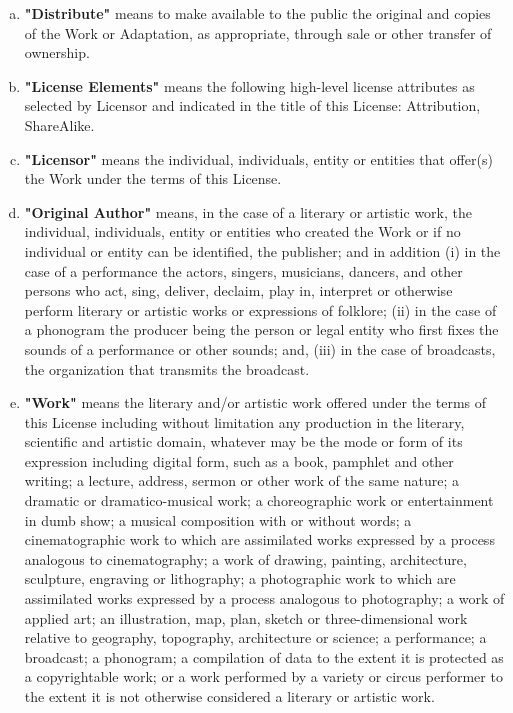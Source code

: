 \begin{enumerate}[a.]
          \item\textbf{"Distribute"} means to make available
          to the public the original and copies of the Work or
          Adaptation, as appropriate, through sale or other
          transfer of ownership.

          \item\textbf{"License Elements"} means the
          following high-level license attributes as selected by
          Licensor and indicated in the title of this License:
          Attribution, ShareAlike.

          \item\textbf{"Licensor"} means the individual,
          individuals, entity or entities that offer(s) the Work
          under the terms of this License.

          \item\textbf{"Original Author"} means, in the case
          of a literary or artistic work, the individual,
          individuals, entity or entities who created the Work or
          if no individual or entity can be identified, the
          publisher; and in addition (i) in the case of a
          performance the actors, singers, musicians, dancers, and
          other persons who act, sing, deliver, declaim, play in,
          interpret or otherwise perform literary or artistic works
          or expressions of folklore; (ii) in the case of a
          phonogram the producer being the person or legal entity
          who first fixes the sounds of a performance or other
          sounds; and, (iii) in the case of broadcasts, the
          organization that transmits the broadcast.

          \item\textbf{"Work"} means the literary and/or
          artistic work offered under the terms of this License
          including without limitation any production in the
          literary, scientific and artistic domain, whatever may be
          the mode or form of its expression including digital
          form, such as a book, pamphlet and other writing; a
          lecture, address, sermon or other work of the same
          nature; a dramatic or dramatico-musical work; a
          choreographic work or entertainment in dumb show; a
          musical composition with or without words; a
          cinematographic work to which are assimilated works
          expressed by a process analogous to cinematography; a
          work of drawing, painting, architecture, sculpture,
          engraving or lithography; a photographic work to which
          are assimilated works expressed by a process analogous to
          photography; a work of applied art; an illustration, map,
          plan, sketch or three-dimensional work relative to
          geography, topography, architecture or science; a
          performance; a broadcast; a phonogram; a compilation of
          data to the extent it is protected as a copyrightable
          work; or a work performed by a variety or circus
          performer to the extent it is not otherwise considered a
          literary or artistic work.


\end{enumerate}

